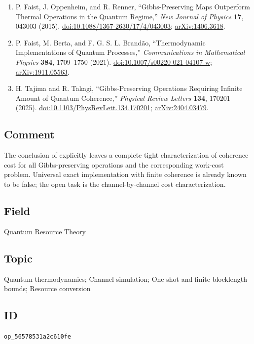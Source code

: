\begin{enumerate}[label={},leftmargin=4.8em,labelsep=0.5em]
  \footnotesize
  \item[\textup{[FOR15]}]\label{ref:p37-faist-oppenheim}
  P. Faist, J. Oppenheim, and R. Renner, ``Gibbs-Preserving Maps Outperform
  Thermal Operations in the Quantum Regime,''
  \emph{New Journal of Physics} \textbf{17}, 043003 (2015).
  \href{https://doi.org/10.1088/1367-2630/17/4/043003}{doi:10.1088/1367-2630/17/4/043003};
  \href{https://arxiv.org/abs/1406.3618}{arXiv:1406.3618}.

  \item[\textup{[FBB21]}]\label{ref:p37-faist-berta}
  P. Faist, M. Berta, and F. G. S. L. Brand\~ao,
  ``Thermodynamic Implementations of Quantum Processes,''
  \emph{Communications in Mathematical Physics} \textbf{384}, 1709--1750
  (2021). \href{https://doi.org/10.1007/s00220-021-04107-w}{doi:10.1007/s00220-021-04107-w};
  \href{https://arxiv.org/abs/1911.05563}{arXiv:1911.05563}.

  \item[\textup{[TT25]}]\label{ref:p37-tajima}
  H. Tajima and R. Takagi, ``Gibbs-Preserving Operations Requiring Infinite
  Amount of Quantum Coherence,'' \emph{Physical Review Letters} \textbf{134},
  170201 (2025).
  \href{https://doi.org/10.1103/PhysRevLett.134.170201}{doi:10.1103/PhysRevLett.134.170201};
  \href{https://arxiv.org/abs/2404.03479}{arXiv:2404.03479}.
\end{enumerate}

\subsection*{Comment}

The conclusion of  explicitly leaves a
complete tight characterization of coherence cost for all Gibbs-preserving
operations and the corresponding work-cost problem.  Universal exact
implementation with finite coherence is already known to be false; the open
task is the channel-by-channel cost characterization.

\subsection*{Field}

Quantum Resource Theory

\subsection*{Topic}

Quantum thermodynamics; Channel simulation; One-shot and finite-blocklength bounds; Resource conversion

\subsection*{ID}

\texttt{op\_56578531a2c610fe}
